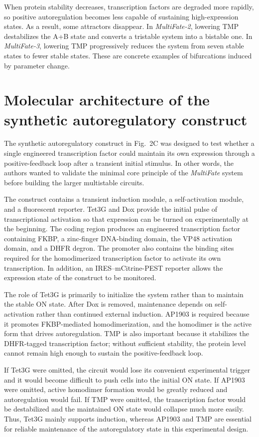 \documentclass[12pt,a4paper]{article}
\begin{document}
When protein stability decreases, transcription factors are degraded more rapidly, so positive autoregulation becomes less capable of sustaining high-expression states. As a result, some attractors disappear. In \textit{MultiFate-2}, lowering TMP destabilizes the A+B state and converts a tristable system into a bistable one. In \textit{MultiFate-3}, lowering TMP progressively reduces the system from seven stable states to fewer stable states. These are concrete examples of bifurcations induced by parameter change.

\section{Molecular architecture of the synthetic autoregulatory construct}
The synthetic autoregulatory construct in Fig.~2C was designed to test whether a single engineered transcription factor could maintain its own expression through a positive-feedback loop after a transient initial stimulus. In other words, the authors wanted to validate the minimal core principle of the \textit{MultiFate} system before building the larger multistable circuits.

The construct contains a transient induction module, a self-activation module, and a fluorescent reporter. Tet3G and Dox provide the initial pulse of transcriptional activation so that expression can be turned on experimentally at the beginning. The coding region produces an engineered transcription factor containing FKBP, a zinc-finger DNA-binding domain, the VP48 activation domain, and a DHFR degron. The promoter also contains the binding sites required for the homodimerized transcription factor to activate its own transcription. In addition, an IRES--mCitrine-PEST reporter allows the expression state of the construct to be monitored.

The role of Tet3G is primarily to initialize the system rather than to maintain the stable ON state. After Dox is removed, maintenance depends on self-activation rather than continued external induction. AP1903 is required because it promotes FKBP-mediated homodimerization, and the homodimer is the active form that drives autoregulation. TMP is also important because it stabilizes the DHFR-tagged transcription factor; without sufficient stability, the protein level cannot remain high enough to sustain the positive-feedback loop.

If Tet3G were omitted, the circuit would lose its convenient experimental trigger and it would become difficult to push cells into the initial ON state. If AP1903 were omitted, active homodimer formation would be greatly reduced and autoregulation would fail. If TMP were omitted, the transcription factor would be destabilized and the maintained ON state would collapse much more easily. Thus, Tet3G mainly supports induction, whereas AP1903 and TMP are essential for reliable maintenance of the autoregulatory state in this experimental design.
\end{document}
